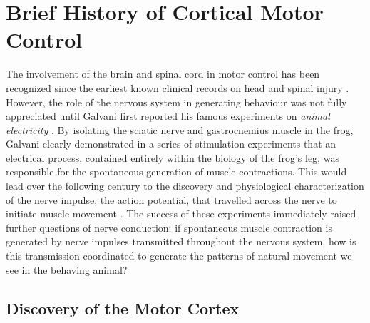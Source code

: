 \section{Brief History of Cortical Motor Control}

The involvement of the brain and spinal cord in motor control has been recognized since the earliest known clinical records on head and spinal injury \cite{Louis1994,VanMiddendorp2010}. However, the role of the nervous system in generating behaviour was not fully appreciated until Galvani first reported his famous experiments on \textit{animal electricity} \cite{Galvani1791}. By isolating the sciatic nerve and gastrocnemius muscle in the frog, Galvani clearly demonstrated in a series of stimulation experiments that an electrical process, contained entirely within the biology of the frog's leg, was responsible for the spontaneous generation of muscle contractions. This would lead over the following century to the discovery and physiological characterization of the nerve impulse, the action potential, that travelled across the nerve to initiate muscle movement \cite{DuBois-Reymond1843,Bernstein1868,Schuetze1983}. The success of these experiments immediately raised further questions of nerve conduction: if spontaneous muscle contraction is generated by nerve impulses transmitted throughout the nervous system, how is this transmission coordinated to generate the patterns of natural movement we see in the behaving animal?

\subsection{Discovery of the Motor Cortex}

